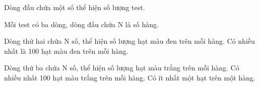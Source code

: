 Dòng đầu chứa một số thể hiện số lượng test.  

   Mỗi test có ba dòng, dòng đầu chứa N là số hàng.  

   Dòng thứ hai chứa N số, thể hiện số lượng hạt màu đen trên mỗi hàng. Có nhiều nhất là 100 hạt màu đen trên mỗi hàng.  

   Dòng thứ ba chứa N số, thể hiện số lượng hạt màu trắng trên mỗi hàng. Có nhiều nhất 100 hạt màu trắng trên mỗi hàng. Có ít nhất một hạt trên một hàng.